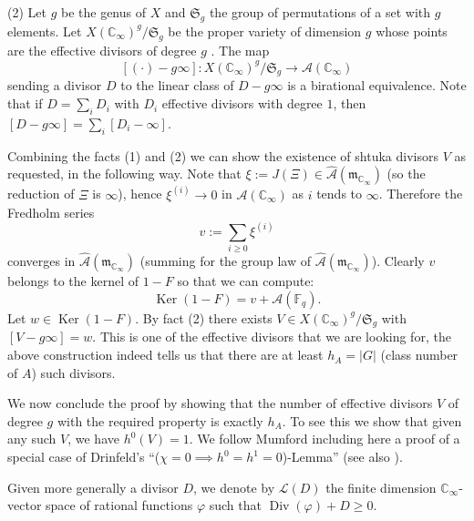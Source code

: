 \documentclass[11pt]{amsart}
\numberwithin{equation}{section}
\newcommand{\Div}{\operatorname{Div}}
\newcommand{\FF}{\mathbb{F}}
\newcommand{\CC}{\mathbb{C}}
\begin{document}
(2) Let $g$ be the genus of $X$ and $\mathfrak{S}_g$ the group of permutations of a set with $g$ elements.
Let $X(\CC_\infty)^g/\mathfrak{S}_g$ be the proper variety of dimension $g$ whose points are the effective divisors of degree $g$
\cite[Propositions 3.1 and 3.2]{MIL}.
The map 
\begin{equation}\label{Jg}
[(\cdot)-g\infty]:X(\CC_\infty)^g/\mathfrak{S}_g\rightarrow\mathcal{A}(\CC_\infty)\end{equation}
sending a divisor $D$ to the linear class of $D-g\infty$ is a birational equivalence. Note that if $D=\sum_iD_i$ with $D_i$ effective divisors with degree $1$, then
$[D-g\infty]=\sum_i[D_i-\infty]$.

Combining the facts (1) and (2) we can show the existence of shtuka divisors $V$ as requested, in the following way. Note that $\xi:=J(\Xi)\in\widehat{\mathcal{A}}(\mathfrak{m}_{\CC_\infty})$ (so the reduction of $\Xi$ is $\infty$), hence $\xi^{(i)}\rightarrow0$ in $\mathcal{A}(\CC_\infty)$ as $i$ tends to $\infty$. Therefore the Fredholm series
\begin{equation}\label{defi-v}
v:=\sum_{i\geq0}\xi^{(i)}\end{equation}
converges in $\widehat{\mathcal{A}}(\mathfrak{m}_{\CC_\infty})$ (summing for the group law of $\widehat{\mathcal{A}}(\mathfrak{m}_{\CC_\infty})$). Clearly $v$ belongs to the kernel of $1-F$ so that we can compute:
$$\operatorname{Ker}(1-F)=v+\mathcal{A}(\FF_q).$$
Let $w\in\operatorname{Ker}(1-F)$. By fact (2) there exists $V\in X(\CC_\infty)^g/\mathfrak{S}_g$ with $[V-g\infty]=w$. This is one of the effective divisors that we are looking for, the above construction indeed tells us that there are at least $h_A=|G|$ (class number of $A$) such divisors.

We now conclude the proof by showing that the number of effective divisors $V$ of degree $g$ with the required property is exactly $h_A$. To see this we show that given any such $V$, we have $h^0(V)=1$. We follow Mumford \cite[\S 3]{MUM} including here a proof of a special case of Drinfeld's ``($\chi=0\implies h^0=h^1=0$)-Lemma'' (see also \cite[Lemma 3.3.1]{AND2}). 

Given more generally a divisor $D$, we denote by $\mathcal{L}(D)$ the finite dimension $\CC_\infty$-vector space of rational functions $\varphi$ such that $\Div(\varphi)+D\geq0$. 
\end{document}
